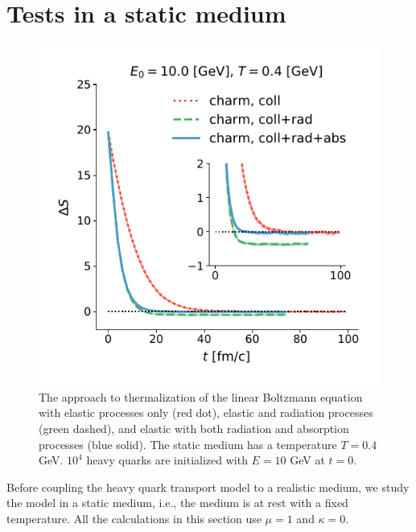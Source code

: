 \documentclass[aps, prc, reprint, amsmath, groupedaddress, nofootinbib]{revtex4-1}
\begin{document}
\section{Tests in a static medium}\label{section:test}
\begin{figure}
\includegraphics[width=\columnwidth]{thermalization.pdf}
\caption{The approach to thermalization of the linear Boltzmann equation with elastic processes only (red dot), elastic and radiation processes (green dashed), and elastic with both radiation and absorption processes (blue solid). The static medium has a temperature $T = 0.4$ GeV. $10^4$ heavy quarks are initialized with $E = 10$ GeV at $t = 0$.}\label{plots:thermalization}
\end{figure}

Before coupling the heavy quark transport model to a realistic medium, we study the model in a static medium, i.e., the medium is at rest with a fixed temperature.
All the calculations in this section use $\mu =1$ and $\kappa = 0$.
\end{document}
